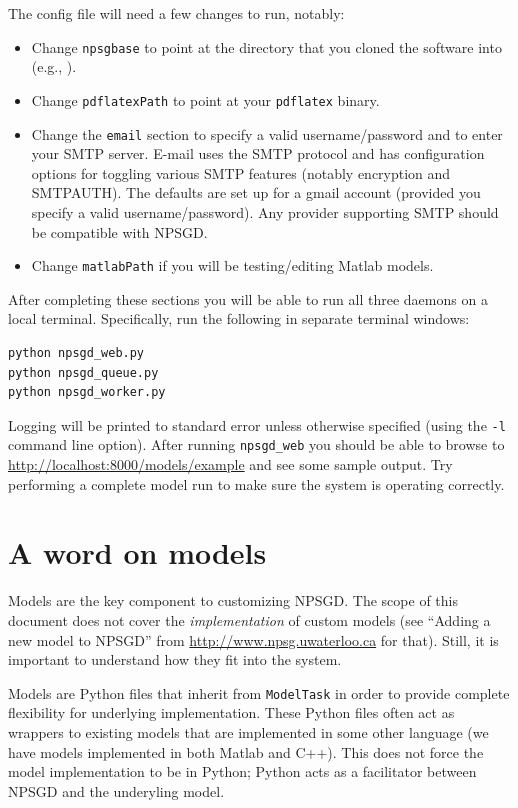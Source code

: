 \documentclass{article}
\newcommand{\mclass}[1]{\texttt{#1}}
\begin{document}
The config file will need a few changes to run, notably:
\begin{itemize}
    \item Change \texttt{npsgbase} to point at the directory that you cloned the
    software into (e.g., ).
    \item Change \texttt{pdflatexPath} to point at your \texttt{pdflatex}
    binary.
    \item Change the \texttt{email} section to specify a valid
    username/password and to enter your SMTP server. E-mail uses the SMTP protocol
    and has configuration
    options for toggling various SMTP features (notably encryption and
    SMTPAUTH). The defaults are set up for a gmail 
    account (provided you specify a valid username/password). Any provider
    supporting SMTP should be compatible with NPSGD.
    \item Change \texttt{matlabPath} if you will be testing/editing Matlab
    models.
\end{itemize}

After completing these sections you will be able to run all three daemons on a
local terminal. Specifically, run the following in separate terminal windows:
\begin{verbatim}
python npsgd_web.py
python npsgd_queue.py
python npsgd_worker.py
\end{verbatim}
Logging will be printed to standard error unless otherwise specified (using the
\texttt{-l} command line option). After
running \texttt{npsgd\_web} you should be able to browse to
\url{http://localhost:8000/models/example} and see some sample output. Try
performing a complete model run to make sure the system is operating correctly.

\section{A word on models}
Models are the key component to customizing NPSGD. The scope of this document
does not cover the \textit{implementation} of custom models (see ``Adding a new
model to NPSGD'' from \url{http://www.npsg.uwaterloo.ca} for that). Still, it is important to understand how they fit
into the system.

Models are Python files that inherit from \mclass{ModelTask} in
order to provide complete flexibility for underlying implementation. These
Python files often act as wrappers to existing models that are implemented in
some other language (we have models implemented in both Matlab and C++). 
This does not force the model implementation to be in Python;
Python acts as a facilitator between NPSGD and the underyling model. 
\end{document}
